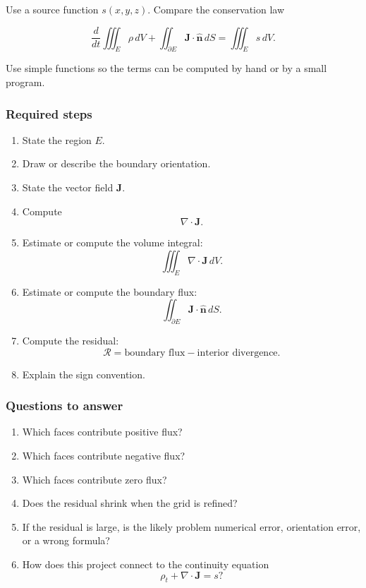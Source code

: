 Use a source function \(s(x,y,z)\).  Compare the conservation law

\[
    \frac{d}{dt}\iiint_E\rho\,dV
    +
    \iint_{\partial E}\mathbf J\cdot\widehat{\mathbf n}\,dS
    =
    \iiint_E s\,dV.
\]

Use simple functions so the terms can be computed by hand or by a small program.

\subsubsection*{Required steps}

\begin{enumerate}
\item State the region \(E\).

\item Draw or describe the boundary orientation.

\item State the vector field \(\mathbf J\).

\item Compute
\[
    \nabla\cdot\mathbf J.
\]

\item Estimate or compute the volume integral:
\[
    \iiint_E\nabla\cdot\mathbf J\,dV.
\]

\item Estimate or compute the boundary flux:
\[
    \iint_{\partial E}\mathbf J\cdot\widehat{\mathbf n}\,dS.
\]

\item Compute the residual:
\[
    \mathcal R
    =
    \text{boundary flux}
    -
    \text{interior divergence}.
\]

\item Explain the sign convention.
\end{enumerate}

\subsubsection*{Questions to answer}

\begin{enumerate}
\item Which faces contribute positive flux?

\item Which faces contribute negative flux?

\item Which faces contribute zero flux?

\item Does the residual shrink when the grid is refined?

\item If the residual is large, is the likely problem numerical error, orientation error, or
a wrong formula?

\item How does this project connect to the continuity equation
\[
    \rho_t+\nabla\cdot\mathbf J=s?
\]
\end{enumerate}

